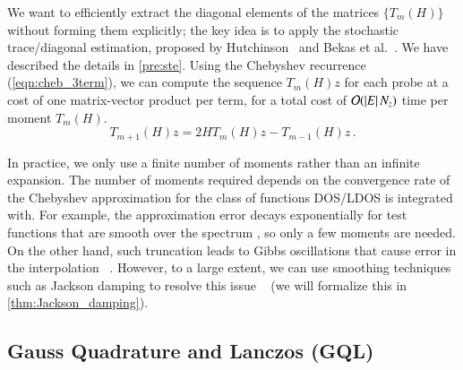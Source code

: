We want to efficiently extract the diagonal elements of the matrices $\{T_m
(H)\}$ without forming them explicitly; the key idea is to apply the stochastic
trace/diagonal estimation, proposed by Hutchinson~
\cite{hutchinson1990stochastic} and Bekas et al.~\cite{bekas2007estimator}.
We have described the details in \cref{pre:ste}. Using the Chebyshev recurrence 
(\cref{eqn:cheb_3term}), we can compute the sequence $T_m(H)z$ for each probe at
a cost of one matrix-vector product per term, for a total cost of $\mathcal{O}(
\left\lvert E\right\rvert N_z)$ time per moment $T_m(H)$.
\begin{equation}\label{eqn:3term_vec}
	T_{m+1}(H)z = 2HT_m(H)z - T_{m-1}(H)z\,.
\end{equation}

In practice, we only use a finite number of moments rather than an infinite
expansion. The number of moments required depends on the convergence rate of the
Chebyshev approximation for the class of functions DOS/LDOS is integrated with.
For example, the approximation error decays exponentially for test functions
that are smooth over the spectrum \cite{Trefethen-2013-ATAP}, so only a few
moments are needed. On the other hand, such truncation leads to Gibbs
oscillations that cause error in the interpolation ~\cite{Trefethen-2013-ATAP}.
However, to a large extent, we can use smoothing techniques such as Jackson
damping to resolve this issue ~\cite{jackson1911genauigkeit} (we will formalize
this in \cref{thm:Jackson_damping}).

\subsection{Gauss Quadrature and Lanczos (GQL)}

